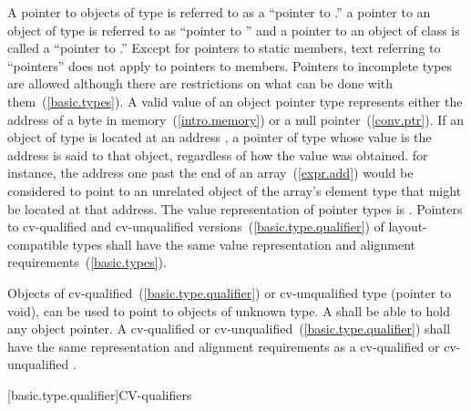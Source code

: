 \pnum
{}%
A pointer to objects of type  is referred to as a ``pointer to
.'' \enterexample a pointer to an object of type  is
referred to as ``pointer to  '' and a pointer to an object of
class  is called a ``pointer to .'' \exitexample
Except for pointers to static members, text referring to ``pointers''
does not apply to pointers to members. Pointers to incomplete types are
allowed although there are restrictions on what can be done with
them~(\ref{basic.types}).
%
A valid value of an object
pointer type represents either the address of a byte in
memory~(\ref{intro.memory}) or a null pointer~(\ref{conv.ptr}). If an
object of type  is located at an address , a pointer
of type   whose value is the address  is
said to  that object, regardless of how the value was
obtained. \enternote for instance, the address one past the end of an
array~(\ref{expr.add}) would be considered to point to an unrelated
object of the array's element type that might be located at that
address. \exitnote The value representation of
pointer types is . Pointers to
cv-qualified and cv-unqualified
versions~(\ref{basic.type.qualifier}) of layout-compatible types shall
have the same value representation and alignment
requirements~(\ref{basic.types}).

\pnum
{}%
%
Objects of cv-qualified~(\ref{basic.type.qualifier}) or cv-unqualified
type  (pointer to void), can be used to point to objects of
unknown type. A  shall be able to hold any object pointer.
A cv-qualified or cv-unqualified~(\ref{basic.type.qualifier})
 shall have the same representation and alignment
requirements as a cv-qualified or cv-unqualified .

[basic.type.qualifier]{CV-qualifiers}

